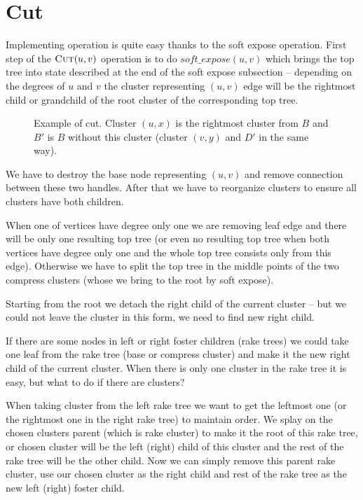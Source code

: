 \section{Cut}

Implementing \Cut{} operation is quite easy thanks to the soft expose operation.
First step of the $\hbox{\sc Cut}(u,v)$ operation is to do $soft\_expose(u,v)$ which brings
the top tree into state described at the end of the soft expose subsection
-- depending on the degrees of $u$ and $v$ the cluster representing
$(u,v)$ edge will be the rightmost child or grandchild of the root cluster of the
corresponding top tree.

\begin{figure}[h]
\centering
{}
\caption{Example of cut. Cluster $(u,x)$ is the rightmost cluster from $B$ and
$B'$ is $B$ without this cluster (cluster $(v,y)$ and $D'$ in the same way).}
\end{figure}

We have to destroy the base node representing $(u,v)$ and remove connection
between these two handles. After that we have to reorganize clusters to ensure
all clusters have both children.

When one of vertices have degree only one we are removing leaf edge and there
will be only one resulting top tree (or even no resulting top tree when both
vertices have degree only one and the whole top tree consists only from this
edge). Otherwise we have to split the top tree in the middle points of the two
compress clusters (whose we bring to the root by soft expose).

Starting from the root we detach the right child of the current cluster -- but
we could not leave the cluster in this form, we need to find new right child.

If there are some nodes in left or right foster children (rake trees) we could
take one leaf from the rake tree (base or compress cluster) and make it the new
right child of the current cluster. When there is only one cluster in the rake
tree it is easy, but what to do if there are clusters?

When taking cluster from the left rake tree we want to get the leftmost one
(or the rightmost one in the right rake tree) to maintain order. We splay on
the chosen clusters parent (which is rake cluster) to make it the root of this
rake tree, or chosen cluster will be the left (right) child of this cluster and
the rest of the rake tree will be the other child. Now we can simply remove this
parent rake cluster, use our chosen cluster as the right child and rest of the
rake tree as the new left (right) foster child.

